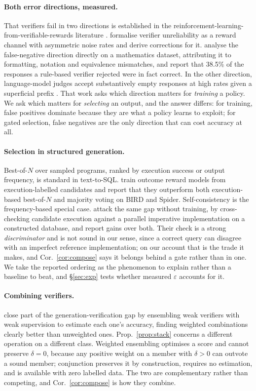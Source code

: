 \documentclass[11pt]{article}
\begin{document}
\paragraph{Both error directions, measured.} That verifiers fail in two directions is established in the reinforcement-learning-from-verifiable-rewards literature \citep{cai2025noisy}. \citep{cai2025noisy} formalise verifier unreliability as a reward channel with asymmetric noise rates and derive corrections for it. \citep{tinyv2025} analyse the false-negative direction directly on a mathematics dataset, attributing it to formatting, notation and equivalence mismatches, and report that 38.5\% of the responses a rule-based verifier rejected were in fact correct. In the other direction, language-model judges accept substantively empty responses at high rates given a superficial prefix \citep{onetoken2025}. That work asks which direction matters for \emph{training} a policy. We ask which matters for \emph{selecting} an output, and the answer differs: for training, false positives dominate because they are what a policy learns to exploit; for gated selection, false negatives are the only direction that can cost accuracy at all.

\paragraph{Selection in structured generation.} Best-of-$N$ over sampled programs, ranked by execution success or output frequency, is standard in text-to-SQL. \citet{gradesql2026} train outcome reward models from execution-labelled candidates and report that they outperform both execution-based best-of-$N$ and majority voting on BIRD and Spider. Self-consistency \citep{wang2023self} is the frequency-based special case. \citet{dpc2026} attack the same gap without training, by cross-checking candidate execution against a parallel imperative implementation on a constructed database, and report gains over both. Their check is a strong \emph{discriminator} and is not sound in our sense, since a correct query can disagree with an imperfect reference implementation; on our account that is the trade it makes, and Cor.~\ref{cor:compose} says it belongs behind a gate rather than in one. We take the reported ordering as the phenomenon to explain rather than a baseline to beat, and \S\ref{sec:exp} tests whether measured $\varepsilon$ accounts for it.

\paragraph{Combining verifiers.} \citet{saadfalcon2025weaver} close part of the generation-verification gap by ensembling weak verifiers with weak supervision to estimate each one's accuracy, finding weighted combinations clearly better than unweighted ones. Prop.~\ref{prop:stack} concerns a different operation on a different class. Weighted ensembling optimises a score and cannot preserve $\delta=0$, because any positive weight on a member with $\delta>0$ can outvote a sound member; conjunction preserves it by construction, requires no estimation, and is available with zero labelled data. The two are complementary rather than competing, and Cor.~\ref{cor:compose} is how they combine.
\end{document}
